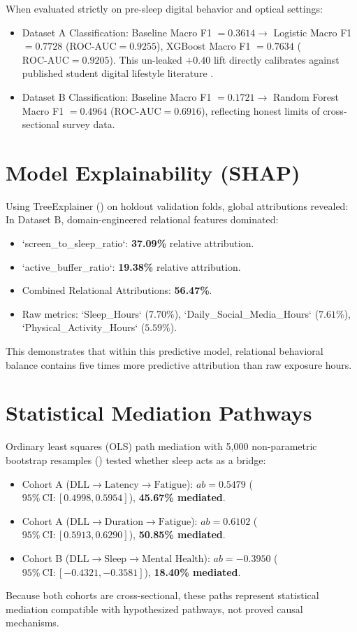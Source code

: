 \documentclass[10pt,twocolumn,a4paper]{article}
\begin{document}
When evaluated strictly on pre-sleep digital behavior and optical settings:
\begin{itemize}
    \item Dataset A Classification: Baseline Macro F1 $= 0.3614 \rightarrow$ Logistic Macro F1 $= \mathbf{0.7728}$ ($\text{ROC-AUC} = \mathbf{0.9255}$), XGBoost Macro F1 $= \mathbf{0.7634}$ ($\text{ROC-AUC} = \mathbf{0.9205}$). This un-leaked $+0.40$ lift directly calibrates against published student digital lifestyle literature \citep{eudl_student_ml2024}.
    \item Dataset B Classification: Baseline Macro F1 $= 0.1721 \rightarrow$ Random Forest Macro F1 $= \mathbf{0.4964}$ ($\text{ROC-AUC} = \mathbf{0.6916}$), reflecting honest limits of cross-sectional survey data.
\end{itemize}

\section{Model Explainability (SHAP)}
Using TreeExplainer (\citeauthor{lundberg2017unified}) on holdout validation folds, global attributions revealed:
In Dataset B, domain-engineered relational features dominated:
\begin{itemize}
    \item `screen\_to\_sleep\_ratio`: \textbf{37.09\%} relative attribution.
    \item `active\_buffer\_ratio`: \textbf{19.38\%} relative attribution.
    \item Combined Relational Attributions: \textbf{56.47\%}.
    \item Raw metrics: `Sleep\_Hours` ($7.70\%$), `Daily\_Social\_Media\_Hours` ($7.61\%$), `Physical\_Activity\_Hours` ($5.59\%$).
\end{itemize}
This demonstrates that within this predictive model, relational behavioral balance contains five times more predictive attribution than raw exposure hours.

\section{Statistical Mediation Pathways}
Ordinary least squares (OLS) path mediation with 5,000 non-parametric bootstrap resamples (\citeauthor{preacher2008asymptotic}) tested whether sleep acts as a bridge:
\begin{itemize}
    \item Cohort A ($\text{DLL} \rightarrow \text{Latency} \rightarrow \text{Fatigue}$): $ab = 0.5479$ ($95\%\ \text{CI}: [0.4998, 0.5954]$), \textbf{45.67\% mediated}.
    \item Cohort A ($\text{DLL} \rightarrow \text{Duration} \rightarrow \text{Fatigue}$): $ab = 0.6102$ ($95\%\ \text{CI}: [0.5913, 0.6290]$), \textbf{50.85\% mediated}.
    \item Cohort B ($\text{DLL} \rightarrow \text{Sleep} \rightarrow \text{Mental Health}$): $ab = -0.3950$ ($95\%\ \text{CI}: [-0.4321, -0.3581]$), \textbf{18.40\% mediated}.
\end{itemize}
Because both cohorts are cross-sectional, these paths represent statistical mediation compatible with hypothesized pathways, not proved causal mechanisms.
\end{document}
